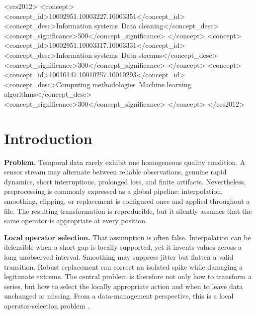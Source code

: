 \documentclass[sigconf,review]{acmart}
\begin{document}
\begin{CCSXML}
<ccs2012>
 <concept>
  <concept_id>10002951.10003227.10003351</concept_id>
  <concept_desc>Information systems~Data cleaning</concept_desc>
  <concept_significance>500</concept_significance>
 </concept>
 <concept>
  <concept_id>10002951.10003317.10003331</concept_id>
  <concept_desc>Information systems~Data streams</concept_desc>
  <concept_significance>300</concept_significance>
 </concept>
 <concept>
  <concept_id>10010147.10010257.10010293</concept_id>
  <concept_desc>Computing methodologies~Machine learning algorithms</concept_desc>
  <concept_significance>300</concept_significance>
 </concept>
</ccs2012>
\end{CCSXML}



\maketitle
{}

\section{Introduction}
\label{sec:introduction}

\textbf{Problem.} Temporal data rarely exhibit one homogeneous quality condition. A sensor stream may alternate between reliable observations, genuine rapid dynamics, short interruptions, prolonged loss, and finite artifacts. Nevertheless, preprocessing is commonly expressed as a global pipeline: interpolation, smoothing, clipping, or replacement is configured once and applied throughout a file. The resulting transformation is reproducible, but it silently assumes that the same operator is appropriate at every position.

\textbf{Local operator selection.} That assumption is often false. Interpolation can be defensible when a short gap is locally supported, yet it invents values across a long unobserved interval. Smoothing may suppress jitter but flatten a valid transition. Robust replacement can correct an isolated spike while damaging a legitimate extreme. The central problem is therefore not only how to transform a series, but how to select the locally appropriate action and when to leave data unchanged or missing. From a data-management perspective, this is a local operator-selection problem \cite{rahm2000data,ilyas2019data,batini2009methodologies}.
\end{document}

